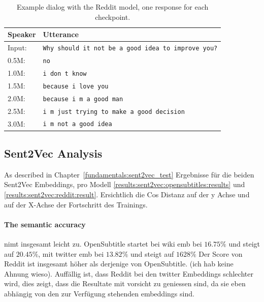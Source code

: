 \begin{table}[H]
	\centering
	\begin{adjustbox}{max width=\textwidth}
		\begin{tabular}{ll}
			\toprule
			Speaker & Utterance\\ \midrule
			Input: 	& \texttt{Why should it not be a good idea to improve you?}\\
			0.5M: 	& \texttt{no}\\
			1.0M: 	& \texttt{i don t know}\\
			1.5M:	& \texttt{because i love you}\\
			2.0M:	& \texttt{because i m a good man}\\
			2.5M:	& \texttt{i m just trying to make a good decision}\\
			3.0M:	& \texttt{i m not a good idea}\\
			\bottomrule
		\end{tabular}
	\end{adjustbox}
	\caption{Example dialog with the Reddit model, one response for each checkpoint.}
	\label{results:example_output2:OpenSubtitle}
\end{table}

\subsection{Sent2Vec Analysis}
As described in Chapter~\ref{fundamentals:sent2vec_test}
Ergebnisse für die beiden Sent2Vec Embeddings, pro Modell \ref{results:sent2vec:opensubtitles:results} und \ref{results:sent2vec:reddit:result}. Ersichtlich die Cos Distanz auf der y Achse und auf der X-Achse der Fortschritt des Trainings.

\paragraph{The semantic accuracy } nimt insgesamt leicht zu. OpenSubtitle startet bei wiki emb bei $16.75\%$ und steigt auf $20.45\%$, mit twitter emb bei $13.82\%$ und steigt auf $1628\%$ Der Score von Reddit ist insgesamt höher als derjenige von OpenSubtitle. (ich hab keine Ahnung wieso). Auffällig ist, dass Reddit bei den twitter Embeddings schlechter wird, dies zeigt, dass die Resultate mit vorsicht zu geniessen sind, da sie eben abhängig von den zur Verfügung stehenden embeddings sind. 

